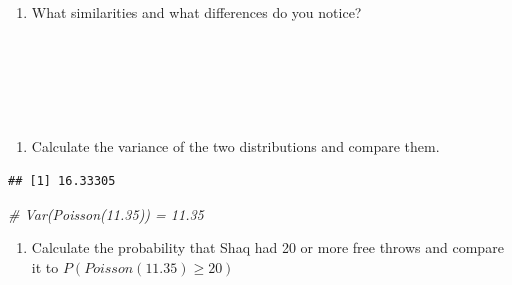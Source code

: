 \documentclass[
  11pt,
]{book}
\newenvironment{Shaded}{\begin{snugshade}}{\end{snugshade}}
\newcommand{\CommentTok}[1]{\textcolor[rgb]{0.56,0.35,0.01}{\textit{#1}}}
\newcommand{\DecValTok}[1]{\textcolor[rgb]{0.00,0.00,0.81}{#1}}
\newcommand{\FunctionTok}[1]{\textcolor[rgb]{0.00,0.00,0.00}{#1}}
\newcommand{\NormalTok}[1]{#1}
\newcommand{\OtherTok}[1]{\textcolor[rgb]{0.56,0.35,0.01}{#1}}
\newcommand{\SpecialCharTok}[1]{\textcolor[rgb]{0.00,0.00,0.00}{#1}}
\providecommand{\tightlist}{%
  \setlength{\itemsep}{0pt}\setlength{\parskip}{0pt}}
\theoremstyle{definition}
\theoremstyle{definition}
\theoremstyle{definition}
\theoremstyle{definition}
\theoremstyle{remark}
\begin{document}
\begin{enumerate}
\def\labelenumi{(\alph{enumi})}
\setcounter{enumi}{2}
\tightlist
\item
  What similarities and what differences do you notice?\\
  \strut \\
  \strut \\
  \strut \\
  \vfill
\end{enumerate}

\newpage

\begin{enumerate}
\def\labelenumi{(\alph{enumi})}
\setcounter{enumi}{3}
\tightlist
\item
  Calculate the variance of the two distributions and compare them.
\end{enumerate}

\begin{Shaded}
\end{Shaded}

\begin{verbatim}
## [1] 16.33305
\end{verbatim}

\begin{Shaded}
\begin{Highlighting}[]
\CommentTok{\# Var(Poisson(11.35)) = 11.35}
\end{Highlighting}
\end{Shaded}

\begin{enumerate}
\def\labelenumi{(\alph{enumi})}
\setcounter{enumi}{4}
\tightlist
\item
  Calculate the probability that Shaq had 20 or more free throws and compare it to \(P(Poisson(11.35) \geq 20)\)
\end{enumerate}

\begin{Shaded}
\end{Shaded}
\end{document}
